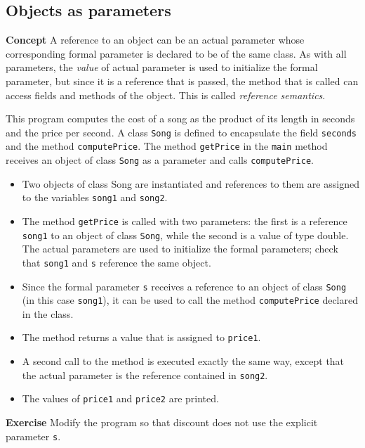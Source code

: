 \subsection{Objects as parameters}\label{method.07}

\textbf{Concept} A reference to an object can be an actual parameter whose
corresponding formal parameter is declared to be of the same class.
As with all parameters, the \emph{value} of actual parameter is used
to initialize the formal parameter, but since it is a reference that is
passed, the method that is called can access fields and methods of the
object. This is called \emph{reference semantics}.


This program computes the cost of a song as the product of its length
in seconds and the price per second. A class \texttt{Song} is defined
to encapsulate the field \texttt{seconds} and the method \texttt{computePrice}.
The method \texttt{getPrice} in the \texttt{main} method receives an object of class
\texttt{Song} as a parameter and calls \texttt{computePrice}.

\begin{itemize}
\item Two objects of class Song are instantiated and references to them
are assigned to the variables \texttt{song1} and \texttt{song2}.
\item The method \texttt{getPrice} is called with two parameters:
the first is a reference \texttt{song1} to an object of class \texttt{Song}, while the second
is a value of type double. The actual parameters are used to initialize the formal
parameters; check that \texttt{song1} and \texttt{s} reference the same object.
\item Since the formal parameter \texttt{s} receives a reference to an object
of class \texttt{Song} (in this case \texttt{song1}), it can be used to call
the method \texttt{computePrice} declared in the class.
\item The method returns a value that is assigned to \texttt{price1}.
\item A second call to the method is executed exactly the same way,
except that the actual parameter is the reference contained in \texttt{song2}.
\item The values of \texttt{price1} and \texttt{price2} are printed.
\end{itemize}

\textbf{Exercise} Modify the program so that discount does not use the explicit
parameter \texttt{s}.
